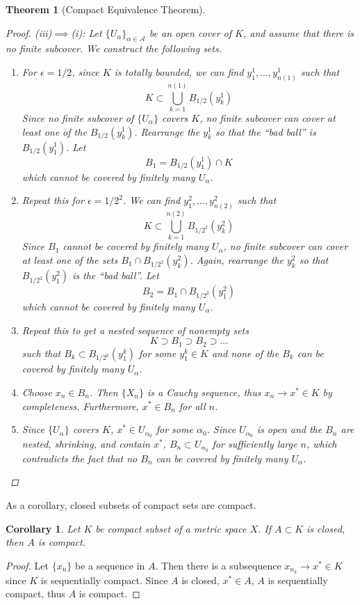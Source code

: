 \documentclass[10pt]{article}         %
\newtheorem{theorem}{Theorem}[section]
\newtheorem{corollary}{Corollary}[section]
\theoremstyle{remark}
\begin{document}
\begin{theorem}[Compact Equivalence Theorem]
\begin{proof}
(iii)$\implies$(i): Let $\{U_\alpha\}_{\alpha \in \mathcal{A}}$ be an open cover of $K$, and assume that there is no finite subcover. We construct the following sets.
\begin{enumerate}
\item For $\epsilon = 1/2$, since $K$ is totally bounded, we can find $y_1^1, \dots, y_{n(1)}^1$ such that
\[
K \subset \bigcup_{k=1}^{n(1)} B_{1/2}(y_k^1)
\]
Since no finite subcover of $\{U_\alpha\}$ covers $K$, no finite subcover can cover at least one of the $B_{1/2}(y_k^1)$. Rearrange the $y_k^1$ so that the ``bad ball'' is $B_{1/2}(y_1^1)$. Let
\[
B_1 = B_{1/2}(y_1^1) \cap K 
\]
which cannot be covered by finitely many $U_\alpha$.
\item Repeat this for $\epsilon = 1/2^2$. We can find $y_1^2, \dots, y_{n(2)}^2$ such that
\[
K \subset \bigcup_{k=1}^{n(2)} B_{1/2^2}(y_k^2)
\]
Since $B_1$ cannot be covered by finitely many $U_\alpha$, no finite subcover can cover at least one of the sets $B_1 \cap B_{1/2^2}(y_k^2)$. Again, rearrange the $y_k^2$ so that $B_{1/2^2}(y_1^2)$ is the ``bad ball''. Let
\[
B_2 = B_1 \cap B_{1/2^2}(y_1^2)
\]
which cannot be covered by finitely many $U_\alpha$.
\item Repeat this to get a nested sequence of nonempty sets
\[
K \supset B_1 \supset B_2 \supset \dots
\]
such that $B_k \subset B_{1/2^k}(y_1^k)$ for some $y_1^k \in K$ and none of the $B_k$ can be covered by finitely many $U_\alpha$.
\item Choose $x_n \in B_n$. Then $\{X_n\}$ is a Cauchy sequence, thus $x_n \rightarrow x^* \in K$ by completeness. Furthermore, $x^* \in B_n$ for all $n$.
\item Since $\{U_\alpha\}$ covers $K$, $x^* \in U_{\alpha_0}$ for some $\alpha_0$. Since $U_{\alpha_0}$ is open and the $B_n$ are nested, shrinking, and contain $x^*$, $B_n \subset U_{\alpha_0}$ for sufficiently large $n$, which contradicts the fact that no $B_n$ can be covered by finitely many $U_\alpha$.
\end{enumerate}
\end{proof}
\end{theorem}

As a corollary, closed subsets of compact sets are compact. 

\begin{corollary}
Let $K$ be compact subset of a metric space $X$. If  $A \subset K$ is closed, then $A$ is compact.
\end{corollary}
\begin{proof}
Let $\{x_n\}$ be a sequence in $A$. Then there is a subsequence $x_{n_k} \rightarrow x^* \in K$ since $K$ is sequentially compact. Since $A$ is closed, $x^* \in A$, $A$ is sequentially compact, thus $A$ is compact.
\end{proof}
\end{document}
